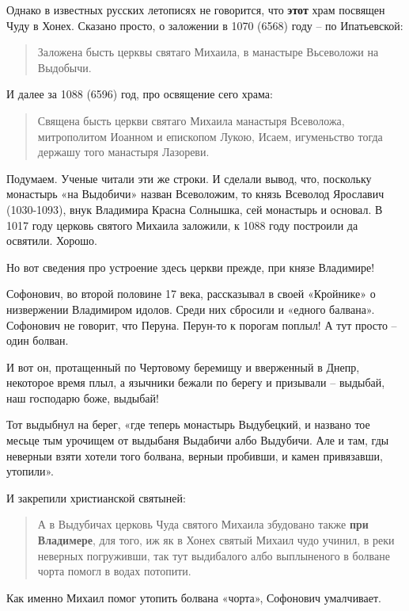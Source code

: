 Однако в известных русских летописях не говорится, что \textbf{этот} храм посвящен Чуду в Хонех. Сказано просто, о заложении в 1070 (6568) году – по Ипатьевской:

\begin{quotation} 
Заложена бысть церквы святаго Михаила, в манастыре Вьсеволожи на Выдобычи.
\end{quotation} 

И далее за 1088 (6596) год, про освящение сего храма:

\begin{quotation} 
Священа бысть церкви святаго Михаила манастыря Всеволожа, митрополитом Иоанном и епископом Лукою, Исаем, игуменьство тогда держашу того манастыря Лазореви.
\end{quotation} 

Подумаем. Ученые читали эти же строки. И сделали вывод, что, поскольку монастырь «на Выдобичи» назван Всеволожим, то князь Всеволод Ярославич (1030-1093), внук Владимира Красна Солнышка, сей монастырь и основал. В 1017 году церковь святого Михаила заложили, к 1088 году построили да освятили. Хорошо. 

Но вот сведения про устроение здесь церкви прежде, при князе Владимире!

Софонович, во второй половине 17 века, рассказывал в своей «Кройнике» о низвержении Владимиром идолов. Среди них сбросили и «едного балвана». Софонович не говорит, что Перуна. Перун-то к порогам поплыл! А тут просто – один болван.

И вот он, протащенный по Чертовому беремищу и вверженный в Днепр, некоторое время плыл, а язычники бежали по берегу и призывали – выдыбай, наш господарю боже, выдыбай!

Тот выдыбнул на берег, «где теперь монастырь Выдубецкий, и названо тое месьце тым урочищем от выдыбаня Выдабичи албо Выдубичи. Але и там, гды неверныи взяти хотели того болвана, верныи пробивши, и камен привязавши, утопили». 

И закрепили христианской святыней:

\begin{quotation} 
А в Выдубичах церковь Чуда святого Михаила збудовано также \textbf{при Владимере}, для того, иж як в Хонех святый Михаил чудо учинил, в реки неверных погруживши, так тут выдибалого албо выплыненого в болване чорта помогл в водах потопити.
\end{quotation} 

Как именно Михаил помог утопить болвана «чорта», Софонович умалчивает. 

